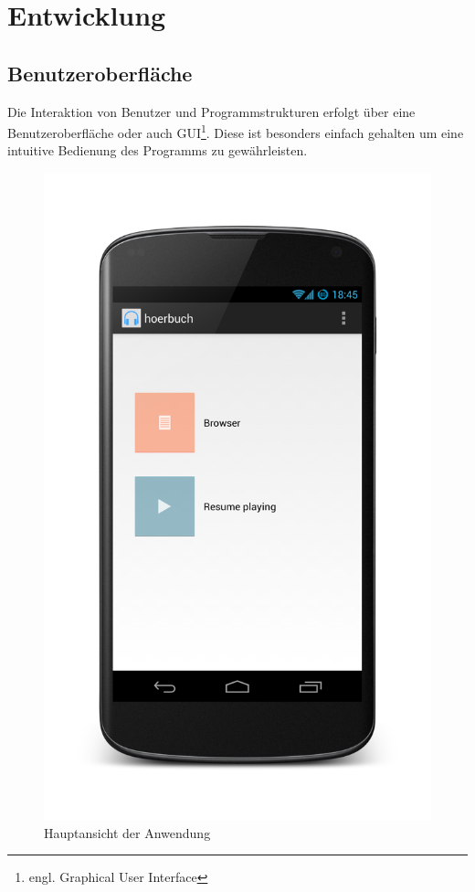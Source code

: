 \section{Entwicklung}
\subsection{Benutzeroberfläche}
Die Interaktion von Benutzer und Programmstrukturen erfolgt über eine Benutzeroberfläche oder auch GUI\footnote{engl. Graphical User Interface}. Diese ist besonders einfach gehalten um eine intuitive Bedienung des Programms zu gewährleisten.

\begin{figure}[h!t]
\begin{center}
\includegraphics[scale=.2]{images/mainscreen}
\caption{Hauptansicht der Anwendung}
\label{mainscreen}
\end{center}
\end{figure}

